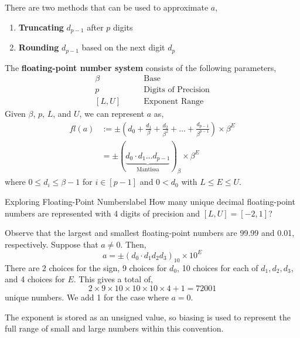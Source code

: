 \begin{rmk}
    There are two methods that can be used to approximate $a$,
    \begin{enumerate}
        \item \textbf{Truncating} $d_{p-1}$ after $p$ digits
        \item \textbf{Rounding} $d_{p-1}$ based on the next digit $d_p$
    \end{enumerate}
\end{rmk}

\begin{defn}
    \sloppy The \textbf{floating-point number system} consists of the following parameters,
    \begin{align*}
        \beta &\quad\quad \text{Base} \\
        p &\quad\quad \text{Digits of Precision} \\
        [L, U] &\quad\quad \text{Exponent Range}
    \end{align*}
    Given $\beta$, $p$, $L$, and $U$, we can represent $a$ as,
    \begin{align*}
    f l(a) &:=\pm\left(d_0+\frac{d_1}{\beta}+\frac{d_2}{\beta^2}+\ldots+\frac{d_{p-1}}{\beta^{p-1}}\right) \times \beta^E \\
    &=\pm(\underbrace{d_0 \cdot d_1 \ldots d_{p-1}}_{\text{Mantissa}})_\beta \times \beta^E
    \end{align*}
    where $0 \leq d_i \leq \beta-1$ for $i \in [p - 1]$ and $0 < d_0$ with $L \leq E \leq U$.
\end{defn}

\begin{ex}{Exploring Floating-Point Numbers}{label}
    How many unique decimal floating-point numbers are represented with 4 digits of precision and $[L, U] = [-2, 1]$?
    
    \LineBreak
    
    Observe that the largest and smallest floating-point numbers are 99.99 and 0.01, respectively. Suppose that $a \neq 0$. Then,
    \[a=\pm\left(d_0 \cdot d_1 d_2 d_3\right)_{10} \times 10^E\]
    There are 2 choices for the sign, 9 choices for $d_0$, 10 choices for each of $d_1, d_2, d_3$, and 4 choices for $E$. This gives a total of, 
    \[2 \times 9 \times 10 \times 10 \times 10 \times 4+1 = 72001\]
    unique numbers. We add 1 for the case where $a = 0$.
\end{ex}

\begin{marginfigure}
    The exponent is stored as an unsigned value, so biasing is used to represent the full range of small and large numbers within this convention.
\end{marginfigure}

